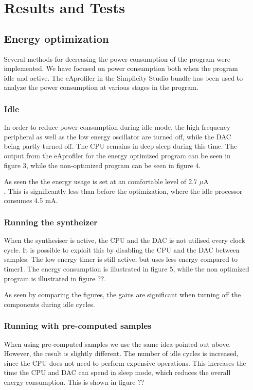 \section{Results and Tests}

\subsection{Energy optimization}
Several methods for decreasing the power consumption of the program were implemented. We have focused on power consumption both when the program idle and active. The eAprofiler in the Simplicity Studio bundle has been used to analyze the power consumption at various stages in the program.

\subsubsection{Idle}
In order to reduce power consumption during idle mode, the high frequency peripheral as well as the low energy oscillator are turned off, while the DAC being partly turned off. The CPU remains in deep sleep during this time. The output from the eAprofiler for the energy optimized program can be seen in figure 3, while the non-optimized program can be seen in figure 4. 





As seen the the energy usage is set at an comfortable level of 2.7 $\mu$A \\. This is significantly less than before the optimization, where the idle processor consumes 4.5 mA. 

\subsubsection{Running the syntheizer}
When the synthesiser is active, the CPU and the DAC is not utilised every clock cycle. It is possible to exploit this by disabling the CPU and the DAC between samples. The low energy timer is still active, but uses less energy compared to timer1. The energy consumption is illustrated in figure 5, while the non optimized program is illustrated in figure ??.    




As seen by comparing the figures, the gains are significant when turning off the components during idle cycles. 


\subsubsection{Running with pre-computed samples}
When using pre-computed samples we use the same idea pointed out above. However, the result is slightly different. The number of idle cycles is increased, since the CPU does not need to perform expensive operations. This increases the time the CPU and DAC can spend in sleep mode, which reduces the overall energy consumption. This is shown in figure ??

